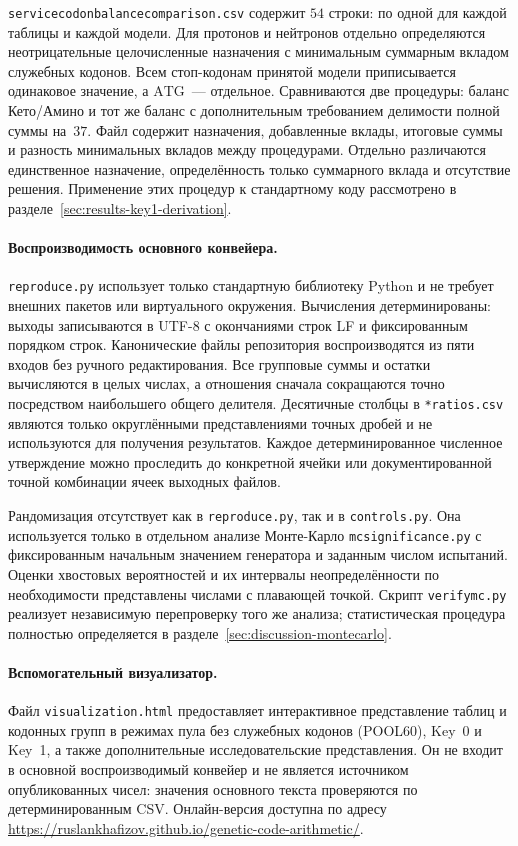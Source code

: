 \documentclass[11pt,a4paper]{article}
\renewcommand{\_}{\origunderscore\allowbreak}
\begin{document}
\texttt{service\_codon\_balance\_comparison.csv} содержит
$54$ строки: по одной для каждой таблицы и каждой модели.
Для протонов и нейтронов отдельно определяются
неотрицательные целочисленные назначения с минимальным
суммарным вкладом служебных кодонов. Всем стоп-кодонам
принятой модели приписывается одинаковое значение,
а $\mathrm{ATG}$~--- отдельное. Сравниваются две процедуры:
баланс Кето/Амино и тот же баланс с дополнительным
требованием делимости полной суммы на~$37$.
Файл содержит назначения, добавленные вклады,
итоговые суммы и разность минимальных вкладов между
процедурами. Отдельно различаются единственное назначение,
определённость только суммарного вклада и отсутствие
решения. Применение этих процедур к стандартному коду
рассмотрено в разделе~\ref{sec:results-key1-derivation}.

\paragraph{Воспроизводимость основного конвейера.}
\texttt{reproduce.py} использует только стандартную библиотеку
Python и не требует внешних пакетов или виртуального окружения.
Вычисления детерминированы: выходы записываются в UTF-8 с окончаниями
строк LF и фиксированным порядком строк. Канонические файлы
репозитория воспроизводятся из пяти входов без ручного редактирования.
Все групповые суммы и остатки вычисляются в целых числах, а отношения
сначала сокращаются точно посредством наибольшего общего делителя.
Десятичные столбцы в \texttt{*\_ratios.csv} являются только
округлёнными представлениями точных дробей и не используются для
получения результатов. Каждое детерминированное численное утверждение
можно проследить до конкретной ячейки или документированной точной
комбинации ячеек выходных файлов.

Рандомизация отсутствует как в \texttt{reproduce.py}, так и в
\texttt{controls.py}. Она используется только в отдельном анализе
Монте-Карло \texttt{mc\_significance.py} с фиксированным начальным
значением генератора и заданным числом испытаний. Оценки хвостовых
вероятностей и их интервалы неопределённости по необходимости
представлены числами с плавающей точкой. Скрипт
\texttt{verify\_mc.py} реализует независимую перепроверку того же
анализа; статистическая процедура полностью определяется в
разделе~\ref{sec:discussion-montecarlo}.

\paragraph{Вспомогательный визуализатор.}
Файл \texttt{visualization.html} предоставляет интерактивное
представление таблиц и кодонных групп в режимах пула без служебных
кодонов (POOL60), Key~0 и Key~1, а также дополнительные
исследовательские представления. Он не входит в основной
воспроизводимый конвейер и не является источником опубликованных
чисел: значения основного текста проверяются по детерминированным
CSV. Онлайн-версия доступна по адресу
\url{https://ruslankhafizov.github.io/genetic-code-arithmetic/}.
\end{document}
